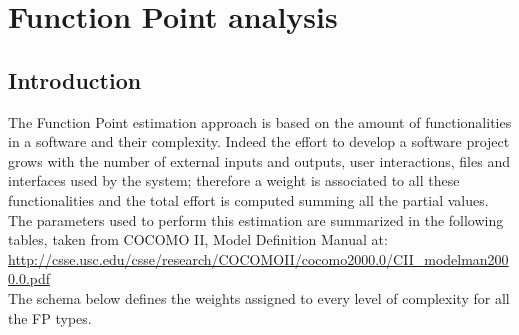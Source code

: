 \documentclass[a4paper,11pt]{report} %
\begin{document}
	\pagebreak		
	\section{Function Point analysis}
		\subsection{Introduction}
			The Function Point estimation approach is based on the amount of functionalities in a software and their complexity. Indeed the effort to develop a software project grows with the number of external inputs and outputs, user interactions, files and interfaces used by the system; therefore a weight is associated to all these functionalities and the total effort is computed summing all the partial values.\bigskip \\
			The parameters used to perform this estimation are summarized in the following tables, taken from COCOMO II, Model Definition Manual at:\smallskip\\ \href{http://csse.usc.edu/csse/research/COCOMOII/cocomo2000.0/CII\_modelman2000.0.pdf}{http://csse.usc.edu/csse/research/COCOMOII/cocomo2000.0/CII\_modelman2000.0.pdf}\bigskip\\
			The schema below defines the weights assigned to every level of complexity for all the FP types.\smallskip\\
			\begin{minipage}{\linewidth}
			\end{minipage}
\end{document}
